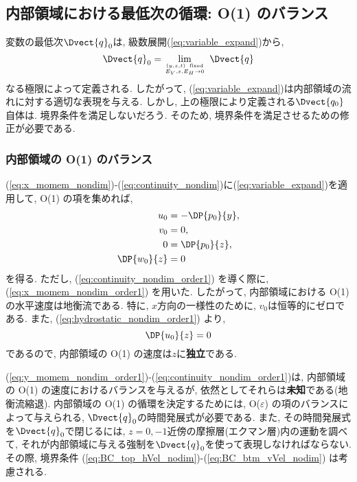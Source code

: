 \subsection{内部領域における最低次の循環: O(1) のバランス}

変数の最低次$\Dvect{q}_0$は, 級数展開(\ref{eq:variable_expand})から, 
\begin{equation}
  \Dvect{q}_0 = \lim_{\scriptsize (y,z,t)\;\; {\rm fixed} \atop \scriptsize E_V, \varepsilon, E_H \to 0} \; \Dvect{q}
\end{equation}
なる極限によって定義される. 
したがって, (\ref{eq:variable_expand})は内部領域の流れに対する適切な表現を与える. 
しかし, 上の極限により定義される$\Dvect{q_0}$自体は. 境界条件を満足しないだろう. 
そのため, 境界条件を満足させるための修正が必要である.  


\subsubsection*{内部領域の O(1) のバランス}
(\ref{eq:x_momem_nondim})-(\ref{eq:continuity_nondim})に(\ref{eq:variable_expand})を適用して, 
O(1) の項を集めれば, 
\begin{subequations}
 \begin{align}
   u_0 &= - \DP{p_0}{y}, 
   \label{eq:y_momem_nondim_order1} \\
   v_0 &= 0,             
   \label{eq:x_momem_nondim_order1}  \\
   0   &= \DP{p_0}{z}, 
   \label{eq:hydrostatic_nondim_order1} \\
   \DP{w_0}{z} &= 0   
   \label{eq:continuity_nondim_order1}
 \end{align}
\end{subequations}
を得る. 
ただし, (\ref{eq:continuity_nondim_order1}) を導く際に, 
(\ref{eq:x_momem_nondim_order1}) を用いた. 
したがって, 内部領域における O(1) の水平速度は地衡流である. 
特に, $x$方向の一様性のために, $v_0$は恒等的にゼロである. 
また, (\ref{eq:hydrostatic_nondim_order1}) より, 
\begin{equation}
  \DP{u_0}{z} = 0
\end{equation}
であるので, 内部領域の O(1) の速度は$z$に\textbf{独立}である. 

(\ref{eq:y_momem_nondim_order1})-(\ref{eq:continuity_nondim_order1})は, 
内部領域の O(1) の速度におけるバランスを与えるが, 依然としてそれらは\textbf{未知}である(地衡流縮退). 
内部領域の O(1) の循環を決定するためには, O($\varepsilon$) の項のバランスによって与えられる, 
$\Dvect{q}_0$の時間発展式が必要である. 
また, その時間発展式を$\Dvect{q}_0$で閉じるには, 
$z=0,-1$近傍の摩擦層(エクマン層)内の運動を調べて, それが内部領域に与える強制を$\Dvect{q}_0$を使って表現しなければならない.  
その際, 境界条件 (\ref{eq:BC_top_hVel_nodim})-(\ref{eq:BC_btm_vVel_nodim}) は考慮される.
 
